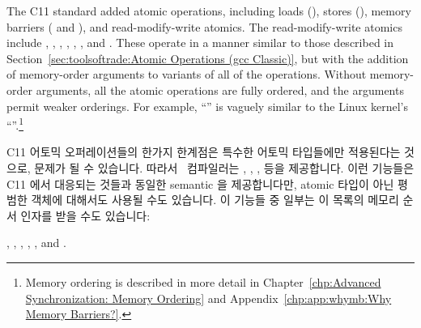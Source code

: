 The C11 standard added atomic operations,
including loads (),
stores (),
memory barriers ( and
), and read-modify-write atomics.
The read-modify-write atomics include
,
,
,
,
,
,
and
.
These operate in a manner similar to those described in
Section~\ref{sec:toolsoftrade:Atomic Operations (gcc Classic)},
but with the addition of memory-order arguments to 
variants of all of the operations.
Without memory-order arguments, all the atomic operations are
fully ordered, and the arguments permit weaker orderings.
For example, ``''
is vaguely similar to the Linux kernel's ``''.\footnote{
	Memory ordering is described in more detail in
	Chapter~\ref{chp:Advanced Synchronization: Memory Ordering} and
	Appendix~\ref{chp:app:whymb:Why Memory Barriers?}.}
\fi

C11 어토믹 오퍼레이션들의 한가지 한계점은 특수한 어토믹 타입들에만 적용된다는
것으로, 문제가 될 수 있습니다.
따라서 \GNUC\ 컴파일러는
,
,
,
 등을 제공합니다.
이런 기능들은 C11 에서 대응되는 것들과 동일한 semantic 을 제공합니다만, atomic
타입이 아닌 평범한 객체에 대해서도 사용될 수도 있습니다.
이 기능들 중 일부는 이 목록의 메모리 순서 인자를 받을 수도 있습니다:

{},
,
,
,
, and
.

